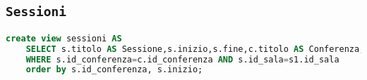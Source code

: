 \subsection{\texttt{Sessioni}}
\begin{lstlisting}[language=SQL,style=mystyle]
	create view sessioni AS
	SELECT s.titolo AS Sessione,s.inizio,s.fine,c.titolo AS Conferenza,s1.nome FROM sessione s, conferenza c,sala s1
	WHERE s.id_conferenza=c.id_conferenza AND s.id_sala=s1.id_sala
	order by s.id_conferenza, s.inizio;
\end{lstlisting}